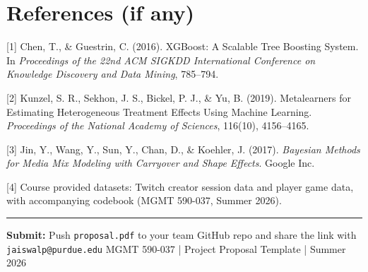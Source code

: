 \documentclass[11pt]{article}
\begin{document}
\section*{References (if any)}


[1] \; Chen, T., \& Guestrin, C. (2016). XGBoost: A Scalable Tree Boosting System. In \textit{Proceedings of the 22nd ACM SIGKDD International Conference on Knowledge Discovery and Data Mining}, 785--794.

[2] \; Kunzel, S. R., Sekhon, J. S., Bickel, P. J., \& Yu, B. (2019). Metalearners for Estimating Heterogeneous Treatment Effects Using Machine Learning. \textit{Proceedings of the National Academy of Sciences}, 116(10), 4156--4165.

[3] \; Jin, Y., Wang, Y., Sun, Y., Chan, D., \& Koehler, J. (2017). \textit{Bayesian Methods for Media Mix Modeling with Carryover and Shape Effects}. Google Inc.

[4] \; Course provided datasets: Twitch creator session data and player game data, with accompanying codebook (MGMT 590-037, Summer 2026).


\vfill\hrule\vspace{4pt}
{\small\color{navyblue}
\textbf{Submit:} Push \texttt{proposal.pdf} to your team GitHub repo and share the link with \texttt{jaiswalp@purdue.edu}
\hfill
MGMT 590-037 \;|\; Project Proposal Template \;|\; Summer 2026}
\end{document}
